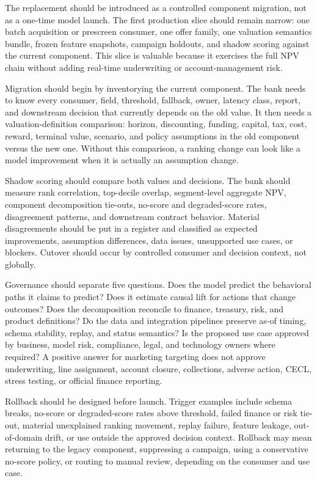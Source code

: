 \documentclass[11pt]{article}
\newcommand{\1}{\mathbf{1}}
\begin{document}
The replacement should be introduced as a controlled component migration, not
as a one-time model launch. The first production slice should remain narrow:
one batch acquisition or prescreen consumer, one offer family, one valuation
semantics bundle, frozen feature snapshots, campaign holdouts, and shadow
scoring against the current component. This slice is valuable because it
exercises the full NPV chain without adding real-time underwriting or
account-management risk.

Migration should begin by inventorying the current component. The bank needs
to know every consumer, field, threshold, fallback, owner, latency class,
report, and downstream decision that currently depends on the old value. It
then needs a valuation-definition comparison: horizon, discounting, funding,
capital, tax, cost, reward, terminal value, scenario, and policy assumptions
in the old component versus the new one. Without this comparison, a ranking
change can look like a model improvement when it is actually an assumption
change.

Shadow scoring should compare both values and decisions. The bank should
measure rank correlation, top-decile overlap, segment-level aggregate NPV,
component decomposition tie-outs, no-score and degraded-score rates,
disagreement patterns, and downstream contract behavior. Material
disagreements should be put in a register and classified as expected
improvements, assumption differences, data issues, unsupported use cases, or
blockers. Cutover should occur by controlled consumer and decision context,
not globally.

Governance should separate five questions. Does the model predict the
behavioral paths it claims to predict? Does it estimate causal lift for actions
that change outcomes? Does the decomposition reconcile to finance, treasury,
risk, and product definitions? Do the data and integration pipelines preserve
as-of timing, schema stability, replay, and status semantics? Is the proposed
use case approved by business, model risk, compliance, legal, and technology
owners where required? A positive answer for marketing targeting does not
approve underwriting, line assignment, account closure, collections, adverse
action, CECL, stress testing, or official finance reporting.

Rollback should be designed before launch. Trigger examples include schema
breaks, no-score or degraded-score rates above threshold, failed finance or
risk tie-out, material unexplained ranking movement, replay failure, feature
leakage, out-of-domain drift, or use outside the approved decision context.
Rollback may mean returning to the legacy component, suppressing a campaign,
using a conservative no-score policy, or routing to manual review, depending
on the consumer and use case.
\end{document}
